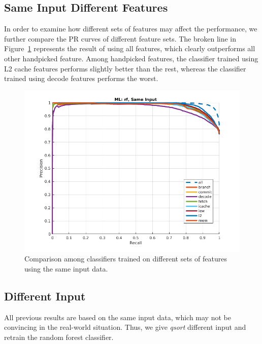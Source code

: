 \subsection{Same Input Different Features}
In order to examine how different sets of features may affect the performance, we further compare the PR curves of different feature sets. The broken line in Figure~\ref{fig:sidf} represents the result of using all features, which clearly outperforms all other handpicked feature. Among handpicked features, the classifier trained using L2 cache features performs slightly better than the rest, whereas the classifier trained using decode features performs the worst.

\begin{figure}[t]
\begin{center}
   \includegraphics[width=0.95\linewidth]{./figures/sidf.png}
\end{center}
    \vspace{-0.4cm}
   \caption{Comparison among classifiers trained on different sets of features using the same input data.}

\label{fig:sidf}
\end{figure}

\subsection{Different Input}
All previous results are based on the same input data, which may not be convincing in the real-world situation. Thus, we give \emph{qsort} different input and retrain the random forest classifier.

